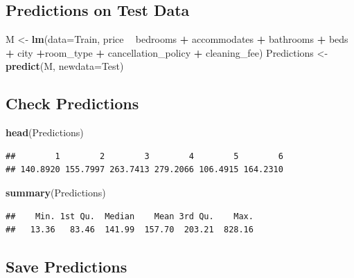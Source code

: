 \documentclass[]{book}
\newenvironment{Shaded}{\begin{snugshade}}{\end{snugshade}}
\newcommand{\KeywordTok}[1]{\textcolor[rgb]{0.13,0.29,0.53}{\textbf{#1}}}
\newcommand{\DataTypeTok}[1]{\textcolor[rgb]{0.13,0.29,0.53}{#1}}
\newcommand{\StringTok}[1]{\textcolor[rgb]{0.31,0.60,0.02}{#1}}
\newcommand{\OperatorTok}[1]{\textcolor[rgb]{0.81,0.36,0.00}{\textbf{#1}}}
\newcommand{\NormalTok}[1]{#1}
\begin{document}
\subsection{Predictions on Test Data}\label{predictions-on-test-data-1}

\begin{Shaded}
\begin{Highlighting}[]
\NormalTok{M <-}\StringTok{ }\KeywordTok{lm}\NormalTok{(}\DataTypeTok{data=}\NormalTok{Train, price }\OperatorTok{~}\StringTok{ }\NormalTok{bedrooms }\OperatorTok{+}\StringTok{ }\NormalTok{accommodates }\OperatorTok{+}\StringTok{ }\NormalTok{bathrooms }\OperatorTok{+}\StringTok{ }\NormalTok{beds }\OperatorTok{+}\StringTok{ }
\StringTok{           }\NormalTok{city }\OperatorTok{+}\NormalTok{room_type }\OperatorTok{+}\StringTok{ }\NormalTok{cancellation_policy }\OperatorTok{+}\StringTok{ }\NormalTok{cleaning_fee)}
\NormalTok{Predictions <-}\StringTok{ }\KeywordTok{predict}\NormalTok{(M, }\DataTypeTok{newdata=}\NormalTok{Test)}
\end{Highlighting}
\end{Shaded}

\subsection{Check Predictions}\label{check-predictions}

\begin{Shaded}
\begin{Highlighting}[]
\KeywordTok{head}\NormalTok{(Predictions)}
\end{Highlighting}
\end{Shaded}

\begin{verbatim}
##        1        2        3        4        5        6 
## 140.8920 155.7997 263.7413 279.2066 106.4915 164.2310
\end{verbatim}

\begin{Shaded}
\begin{Highlighting}[]
\KeywordTok{summary}\NormalTok{(Predictions)}
\end{Highlighting}
\end{Shaded}

\begin{verbatim}
##    Min. 1st Qu.  Median    Mean 3rd Qu.    Max. 
##   13.36   83.46  141.99  157.70  203.21  828.16
\end{verbatim}

\subsection{Save Predictions}\label{save-predictions}
\end{document}
